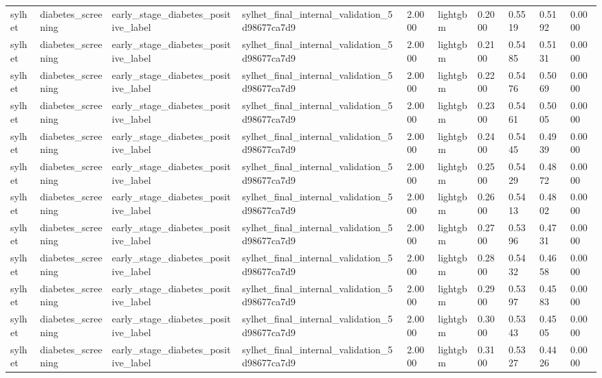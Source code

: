 \begin{tabular}{llllllllll}
sylhet & diabetes\_screening & early\_stage\_diabetes\_positive\_label & sylhet\_final\_internal\_validation\_5d98677ca7d9 & 2.0000 & lightgbm & 0.2000 & 0.5519 & 0.5192 & 0.0000 \\
sylhet & diabetes\_screening & early\_stage\_diabetes\_positive\_label & sylhet\_final\_internal\_validation\_5d98677ca7d9 & 2.0000 & lightgbm & 0.2100 & 0.5485 & 0.5131 & 0.0000 \\
sylhet & diabetes\_screening & early\_stage\_diabetes\_positive\_label & sylhet\_final\_internal\_validation\_5d98677ca7d9 & 2.0000 & lightgbm & 0.2200 & 0.5476 & 0.5069 & 0.0000 \\
sylhet & diabetes\_screening & early\_stage\_diabetes\_positive\_label & sylhet\_final\_internal\_validation\_5d98677ca7d9 & 2.0000 & lightgbm & 0.2300 & 0.5461 & 0.5005 & 0.0000 \\
sylhet & diabetes\_screening & early\_stage\_diabetes\_positive\_label & sylhet\_final\_internal\_validation\_5d98677ca7d9 & 2.0000 & lightgbm & 0.2400 & 0.5445 & 0.4939 & 0.0000 \\
sylhet & diabetes\_screening & early\_stage\_diabetes\_positive\_label & sylhet\_final\_internal\_validation\_5d98677ca7d9 & 2.0000 & lightgbm & 0.2500 & 0.5429 & 0.4872 & 0.0000 \\
sylhet & diabetes\_screening & early\_stage\_diabetes\_positive\_label & sylhet\_final\_internal\_validation\_5d98677ca7d9 & 2.0000 & lightgbm & 0.2600 & 0.5413 & 0.4802 & 0.0000 \\
sylhet & diabetes\_screening & early\_stage\_diabetes\_positive\_label & sylhet\_final\_internal\_validation\_5d98677ca7d9 & 2.0000 & lightgbm & 0.2700 & 0.5396 & 0.4731 & 0.0000 \\
sylhet & diabetes\_screening & early\_stage\_diabetes\_positive\_label & sylhet\_final\_internal\_validation\_5d98677ca7d9 & 2.0000 & lightgbm & 0.2800 & 0.5432 & 0.4658 & 0.0000 \\
sylhet & diabetes\_screening & early\_stage\_diabetes\_positive\_label & sylhet\_final\_internal\_validation\_5d98677ca7d9 & 2.0000 & lightgbm & 0.2900 & 0.5397 & 0.4583 & 0.0000 \\
sylhet & diabetes\_screening & early\_stage\_diabetes\_positive\_label & sylhet\_final\_internal\_validation\_5d98677ca7d9 & 2.0000 & lightgbm & 0.3000 & 0.5343 & 0.4505 & 0.0000 \\
sylhet & diabetes\_screening & early\_stage\_diabetes\_positive\_label & sylhet\_final\_internal\_validation\_5d98677ca7d9 & 2.0000 & lightgbm & 0.3100 & 0.5327 & 0.4426 & 0.0000 \\

\end{tabular}
